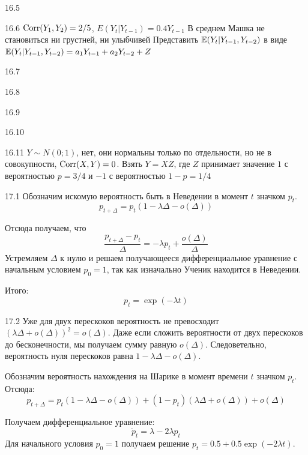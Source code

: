 \protect \hypertarget {soln:16.5}{}
\begin{solution}{{16.5}}
\end{solution}
\protect \hypertarget {soln:16.6}{}
\begin{solution}{{16.6}}
  $\operatorname{Corr}(Y_1, Y_2) = 2/5$, $E(Y_t | Y_{t-1}) = 0.4 Y_{t-1}$
  В среднем Машка не становиться ни грустней, ни улыбчивей
  Представить $\mathbb{E}(Y_t | Y_{t-1}, Y_{t-2})$ в виде $\mathbb{E}(Y_t | Y_{t-1}, Y_{t-2}) = a_1 Y_{t-1} + a_2 Y_{t-2} + Z$
\end{solution}
\protect \hypertarget {soln:16.7}{}
\begin{solution}{{16.7}}
\end{solution}
\protect \hypertarget {soln:16.8}{}
\begin{solution}{{16.8}}
\end{solution}
\protect \hypertarget {soln:16.9}{}
\begin{solution}{{16.9}}
\end{solution}
\protect \hypertarget {soln:16.10}{}
\begin{solution}{{16.10}}
\end{solution}
\protect \hypertarget {soln:16.11}{}
\begin{solution}{{16.11}}
  $Y \sim N(0;1)$, нет, они нормальны только по отдельности, но не в совокупности, $\operatorname{Corr}(X,Y)=0$. Взять $Y=XZ$, где $Z$ принимает значение $1$ с вероятностью $p=3/4$ и $-1$ с вероятностью $1-p=1/4$
\end{solution}
\protect \hypertarget {soln:17.1}{}
\begin{solution}{{17.1}}
Обозначим искомую вероятность быть в Неведении в момент $t$ значком $p_t$.
\[
p_{t+\Delta} = p_t (1-\lambda\Delta - o(\Delta))
\]

Отсюда получаем, что
\[
\frac{p_{t+\Delta} - p_t}{\Delta} = -\lambda p_t + \frac{o(\Delta)}{\Delta}
\]
Устремляем $\Delta$ к нулю и решаем получающееся дифференциальное уравнение
с начальным условием $p_0 = 1$, так как изначально Ученик находится в Неведении.

Итого:
\[
p_t = \exp(-\lambda t)
\]
\end{solution}
\protect \hypertarget {soln:17.2}{}
\begin{solution}{{17.2}}
Уже для двух перескоков вероятность не превосходит $(\lambda\Delta + o(\Delta))^2 = o(\Delta)$.
Даже если сложить вероятности от двух перескоков до бесконечности,
мы получаем сумму равную $o(\Delta)$.
Следоветельно, вероятность нуля перескоков равна $1-\lambda\Delta - o(\Delta)$.

Обозначим вероятность нахождения на Шарике в момент времени $t$ значком $p_t$.
Отсюда:
\[
p_{t+\Delta} = p_t(1-\lambda\Delta - o(\Delta)) + (1-p_t)(\lambda\Delta + o(\Delta)) + o(\Delta)
\]

Получаем дифференциальное уравнение:
\[
\dot p_t = \lambda - 2\lambda p_t
\]
Для начального условия $p_0=1$ получаем решение $p_t = 0.5 + 0.5 \exp(-2\lambda t)$.
\end{solution}
